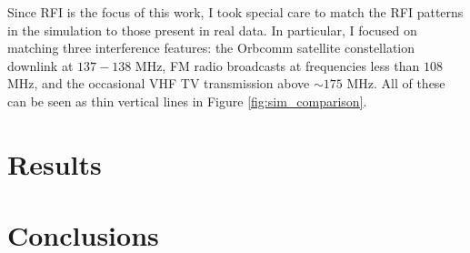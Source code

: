 \documentclass[12pt]{article}
\begin{document}
Since RFI is the focus of this work, I took special care to  match the RFI patterns in the simulation to those present in real data. In particular, I focused on matching three interference features: the Orbcomm satellite constellation downlink at $137 - 138$ MHz, FM radio broadcasts at frequencies less than $108$ MHz, and the occasional VHF TV transmission above $\sim 175$ MHz. All of these can be seen as thin vertical lines in Figure \ref{fig:sim_comparison}.

\section{Results}

\section{Conclusions}



\end{document}
